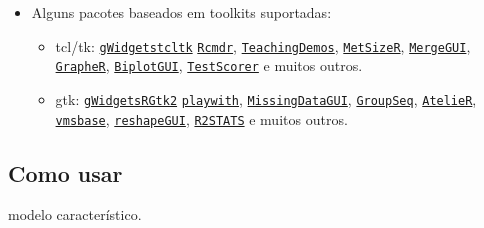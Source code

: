 \begin{frame}

  \begin{itemize}
  \item Alguns pacotes baseados em toolkits suportadas:
    \begin{itemize}
    \item tcl/tk:
      \href{http://cran.r-project.org/web/packages/gWidgetstcltk/index.html}{\texttt{gWidgetstcltk}}
      \href{http://cran.r-project.org/web/packages/Rcmdr/index.html}{\texttt{Rcmdr}},
      \href{http://cran.r-project.org/web/packages/TeachingDemos/index.html}{\texttt{TeachingDemos}},
      \href{http://cran.r-project.org/web/packages/MetSizeR/index.html}{\texttt{MetSizeR}},
      \href{http://cran.r-project.org/web/packages/MergeGUI/index.html}{\texttt{MergeGUI}},
      \href{http://cran.r-project.org/web/packages/GrapheR/index.html}{\texttt{GrapheR}},
      \href{http://cran.r-project.org/web/packages/BiplotGUI/index.html}{\texttt{BiplotGUI}},
      \href{http://cran.r-project.org/web/packages/TestScorer/index.html}{\texttt{TestScorer}}
      e muitos outros.
    \item gtk:
      \href{http://cran.r-project.org/web/packages/gWidgetsRGtk2/index.html}{\texttt{gWidgetsRGtk2}}
      \href{http://cran.r-project.org/web/packages/playwith/index.html}{\texttt{playwith}},
      \href{http://cran.r-project.org/web/packages/MissingDataGUI/index.html}{\texttt{MissingDataGUI}},
      \href{http://cran.r-project.org/web/packages/GroupSeq/index.html}{\texttt{GroupSeq}},
      \href{http://cran.r-project.org/web/packages/AtelieR/index.html}{\texttt{AtelieR}},
      \href{http://cran.r-project.org/web/packages/vmsbase/index.html}{\texttt{vmsbase}},
      \href{http://cran.r-project.org/web/packages/reshapeGUI/index.html}{\texttt{reshapeGUI}},
      \href{http://cran.r-project.org/web/packages/R2STATS/index.html}{\texttt{R2STATS}}
      e muitos outros.
  \end{itemize}
\end{itemize}

\end{frame}


\subsection{Como usar}

\begin{frame}

  modelo característico.

\end{frame}

